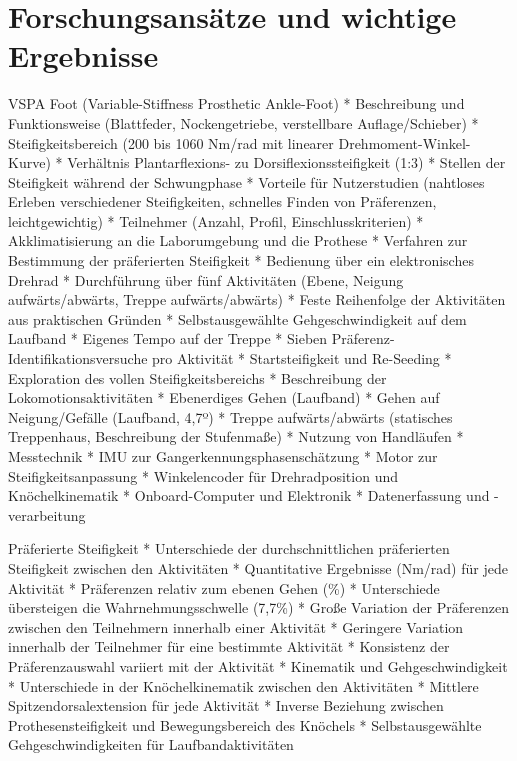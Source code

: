 \section{Forschungsansätze und wichtige Ergebnisse}
VSPA Foot (Variable-Stiffness Prosthetic Ankle-Foot) *   Beschreibung und Funktionsweise (Blattfeder, Nockengetriebe, verstellbare Auflage/Schieber) *   Steifigkeitsbereich (200 bis 1060 Nm/rad mit linearer Drehmoment-Winkel-Kurve) *   Verhältnis Plantarflexions- zu Dorsiflexionssteifigkeit (1:3) *   Stellen der Steifigkeit während der Schwungphase *   Vorteile für Nutzerstudien (nahtloses Erleben verschiedener Steifigkeiten, schnelles Finden von Präferenzen, leichtgewichtig) *   Teilnehmer (Anzahl, Profil, Einschlusskriterien) *   Akklimatisierung an die Laborumgebung und die Prothese *   Verfahren zur Bestimmung der präferierten Steifigkeit *   Bedienung über ein elektronisches Drehrad *   Durchführung über fünf Aktivitäten (Ebene, Neigung aufwärts/abwärts, Treppe aufwärts/abwärts) *   Feste Reihenfolge der Aktivitäten aus praktischen Gründen *   Selbstausgewählte Gehgeschwindigkeit auf dem Laufband *   Eigenes Tempo auf der Treppe *   Sieben Präferenz-Identifikationsversuche pro Aktivität *   Startsteifigkeit und Re-Seeding *   Exploration des vollen Steifigkeitsbereichs *   Beschreibung der Lokomotionsaktivitäten *   Ebenerdiges Gehen (Laufband) *   Gehen auf Neigung/Gefälle (Laufband, 4,7º) *   Treppe aufwärts/abwärts (statisches Treppenhaus, Beschreibung der Stufenmaße) *   Nutzung von Handläufen *   Messtechnik *   IMU zur Gangerkennungsphasenschätzung *   Motor zur Steifigkeitsanpassung *   Winkelencoder für Drehradposition und Knöchelkinematik *   Onboard-Computer und Elektronik *   Datenerfassung und -verarbeitung
 
Präferierte Steifigkeit *   Unterschiede der durchschnittlichen präferierten Steifigkeit zwischen den Aktivitäten *   Quantitative Ergebnisse (Nm/rad) für jede Aktivität *   Präferenzen relativ zum ebenen Gehen (\%) *   Unterschiede übersteigen die Wahrnehmungsschwelle (7,7\%) *   Große Variation der Präferenzen zwischen den Teilnehmern innerhalb einer Aktivität *   Geringere Variation innerhalb der Teilnehmer für eine bestimmte Aktivität *   Konsistenz der Präferenzauswahl variiert mit der Aktivität *   Kinematik und Gehgeschwindigkeit *   Unterschiede in der Knöchelkinematik zwischen den Aktivitäten *   Mittlere Spitzendorsalextension für jede Aktivität *   Inverse Beziehung zwischen Prothesensteifigkeit und Bewegungsbereich des Knöchels *   Selbstausgewählte Gehgeschwindigkeiten für Laufbandaktivitäten

